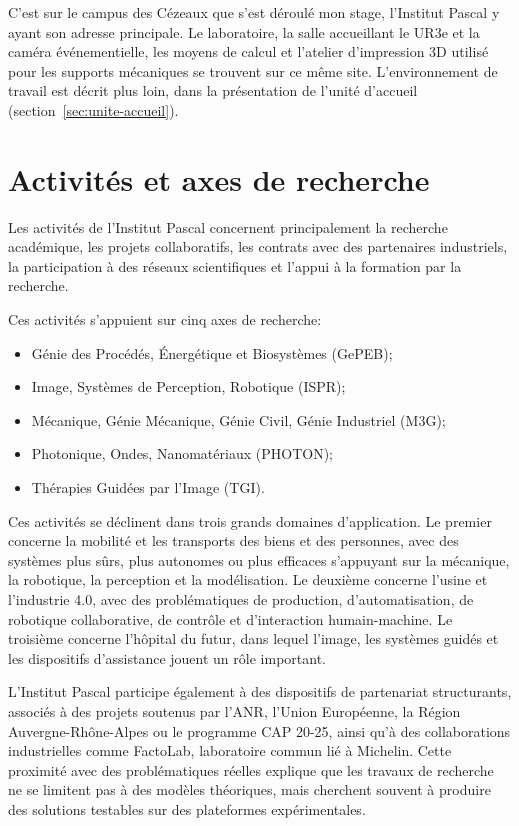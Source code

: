 \documentclass[a4paper,11pt]{report}
\begin{document}
C'est sur le campus des Cézeaux que s'est déroulé mon stage, l'Institut Pascal y ayant son adresse principale. Le laboratoire, la salle accueillant le UR3e et la caméra événementielle, les moyens de calcul et l'atelier d'impression 3D utilisé pour les supports mécaniques se trouvent sur ce même site. L'environnement de travail est décrit plus loin, dans la présentation de l'unité d'accueil (section~\ref{sec:unite-accueil}).

\section{Activités et axes de recherche}

Les activités de l'Institut Pascal concernent principalement la recherche académique, les projets collaboratifs, les contrats avec des partenaires industriels, la participation à des réseaux scientifiques et l'appui à la formation par la recherche.

Ces activités s'appuient sur cinq axes de recherche:
\begin{itemize}
  \item Génie des Procédés, Énergétique et Biosystèmes (GePEB);
  \item Image, Systèmes de Perception, Robotique (ISPR);
  \item Mécanique, Génie Mécanique, Génie Civil, Génie Industriel (M3G);
  \item Photonique, Ondes, Nanomatériaux (PHOTON);
  \item Thérapies Guidées par l'Image (TGI).
\end{itemize}

Ces activités se déclinent dans trois grands domaines d'application. Le premier concerne la mobilité et les transports des biens et des personnes, avec des systèmes plus sûrs, plus autonomes ou plus efficaces s'appuyant sur la mécanique, la robotique, la perception et la modélisation. Le deuxième concerne l'usine et l'industrie 4.0, avec des problématiques de production, d'automatisation, de robotique collaborative, de contrôle et d'interaction humain-machine. Le troisième concerne l'hôpital du futur, dans lequel l'image, les systèmes guidés et les dispositifs d'assistance jouent un rôle important.

L'Institut Pascal participe également à des dispositifs de partenariat structurants, associés à des projets soutenus par l'ANR, l'Union Européenne, la Région Auvergne-Rhône-Alpes ou le programme CAP 20-25, ainsi qu'à des collaborations industrielles comme FactoLab, laboratoire commun lié à Michelin. Cette proximité avec des problématiques réelles explique que les travaux de recherche ne se limitent pas à des modèles théoriques, mais cherchent souvent à produire des solutions testables sur des plateformes expérimentales.
\end{document}
